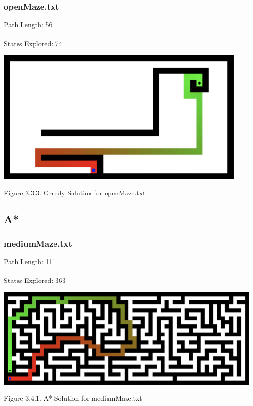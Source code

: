 \documentclass{mcmthesis}
\begin{document}
\subsubsection{openMaze.txt}
Path Length: 56 \\ \\
States Explored: 74
\begin{center}
\includegraphics[width=12.5cm]{greedy_openmaze.png}
\end{center}
\begin{center}
\small{Figure 3.3.3. Greedy Solution for openMaze.txt}
\end{center}

\subsection{A*}



\subsubsection{mediumMaze.txt}
Path Length: 111 \\ \\
States Explored: 363
\begin{center}
\includegraphics[width=15cm]{A_mediummaze.png}
\end{center}
\begin{center}
\small{Figure 3.4.1. A* Solution for mediumMaze.txt}
\end{center}
\end{document}
